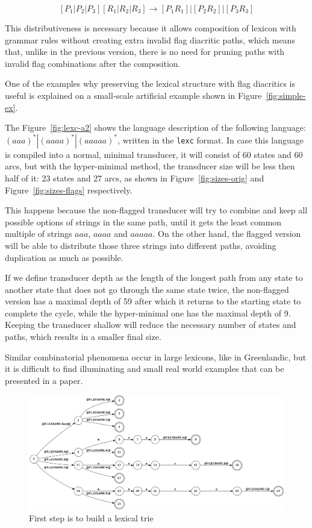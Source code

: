 \documentclass[11pt]{article}
\begin{document}
\begin{equation}\label{hub_replacement}
[P_1 | P_2 | P_3] [R_1 | R_2 | R_3] \rightarrow [P_1 R_1] | [P_2 R_2] | [P_3 R_3]
\end{equation}



This distributiveness is necessary because it allows 
composition of lexicon with grammar rules without creating extra invalid flag diacritic paths, which means that, 
unlike in the previous version, there is no need for pruning paths with invalid flag combinations after the composition.


One of the examples why preserving the lexical structure with flag diacritics is useful is explained on a small-scale artificial example shown in 
Figure~\ref{fig:simple-ex}.
 
The Figure~\ref{fig:lexc-a2} shows the language description of the following language: $(aaa)^*|(aaaa)^*|(aaaaa)^*$, written in 
the \texttt{lexc} format. In case this language is compiled into a normal, minimal transducer, it will consist of 60 states and 60 arcs, 
but with the hyper-minimal method, the transducer size will be less then half of it: 23 states and 27 arcs, as shown in 
Figure~\ref{fig:sizes-orig} and Figure~\ref{fig:sizes-flags} respectively.

This happens because the non-flagged transducer will try to combine and keep all possible options of strings in the same path, until it gets 
the least common multiple of strings $aaa$, $aaaa$ and $aaaaa$. On the other hand, the flagged version will be able to distribute those three 
strings into different paths, avoiding duplication as much as possible.

If we define transducer depth as the length of the longest path from any state to another state that does not go through the same state twice, 
the non-flagged version has a maximal depth of 59 after which it returns to the starting state to complete the cycle, while the hyper-minimal 
one has the maximal depth of 9. Keeping the transducer shallow will reduce the necessary number of states and paths, which results in a smaller final size.

Similar combinatorial phenomena occur in large lexicons, like in Greenlandic, but it is difficult to find illuminating and small real 
world examples that can be presented in a paper.


\begin{figure}
    \includegraphics[width=\textwidth]{trie.png}
     \caption{First step is to build a lexical trie
     \label{fig:trie}}
\end{figure}
\end{document}

